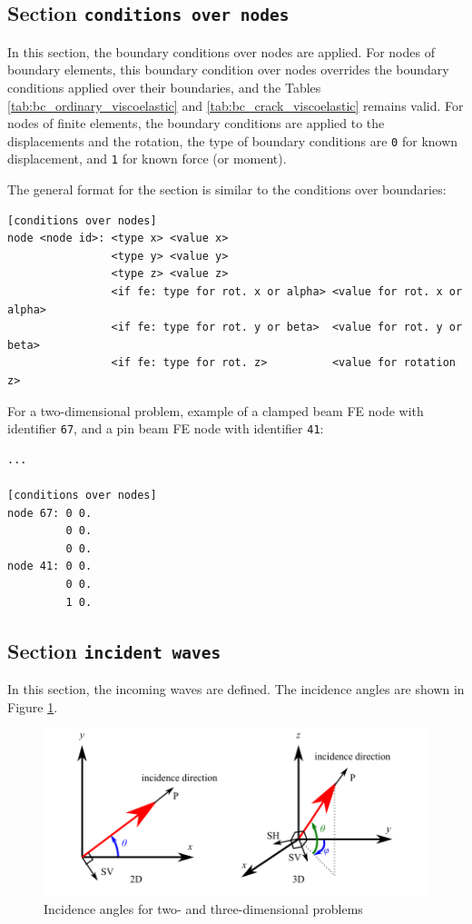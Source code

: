 \documentclass[a4paper,fleqn]{book}
\begin{document}
\subsection{Section \texttt{conditions over nodes}}
In this section, the boundary conditions over nodes are applied. For nodes of boundary elements, this boundary condition over nodes overrides the boundary conditions applied over their boundaries, and the Tables \ref{tab:bc_ordinary_viscoelastic} and \ref{tab:bc_crack_viscoelastic} remains valid. For nodes of finite elements, the boundary conditions are applied to the displacements and the rotation, the type of boundary conditions are \texttt{0} for known displacement, and \texttt{1} for known force (or moment).

The general format for the section is similar to the conditions over boundaries:
\begin{Verbatim}[frame=single, fontsize=\small, label={general format of section [conditions over nodes]}]
[conditions over nodes]
node <node id>: <type x> <value x>
                <type y> <value y>
                <type z> <value z>
                <if fe: type for rot. x or alpha> <value for rot. x or alpha>
                <if fe: type for rot. y or beta>  <value for rot. y or beta>
                <if fe: type for rot. z>          <value for rotation z>
\end{Verbatim} 

For a two-dimensional problem, example of a clamped beam FE node with identifier \texttt{67}, and a pin beam FE node with identifier \texttt{41}: 
\begin{Verbatim}[frame=single, fontsize=\small, label={input.dat}]
...

[conditions over nodes]
node 67: 0 0.
         0 0.
         0 0.
node 41: 0 0.
         0 0.
         1 0.
\end{Verbatim} 

\subsection{Section \texttt{incident waves}}
In this section, the incoming waves are defined. The incidence angles are shown in Figure \ref{fig:incidence}.

\begin{figure}[h]
\centering
%
\includegraphics{figures/incidence_angle.pdf}
\caption{Incidence angles for two- and three-dimensional problems\label{fig:incidence}}
\end{figure}
\end{document}
